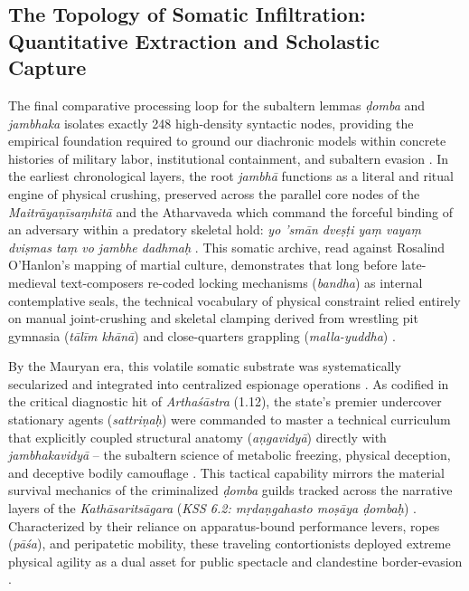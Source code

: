 \documentclass[11pt,twoside,letterpaper]{article}
\begin{document}
\subsection{The Topology of Somatic Infiltration: Quantitative Extraction and Scholastic Capture}
The final comparative processing loop for the subaltern lemmas \textit{ḍomba} and \textit{jambhaka} isolates exactly 248 high-density syntactic nodes, providing the empirical foundation required to ground our diachronic models within concrete histories of military labor, institutional containment, and subaltern evasion \citep{Lorenzen1978, mccartneyforthcomingA}. In the earliest chronological layers, the root \textit{jambhā} functions as a literal and ritual engine of physical crushing, preserved across the parallel core nodes of the \textit{Maitrāyaṇīsaṃhitā} and the Atharvaveda which command the forceful binding of an adversary within a predatory skeletal hold: \textit{yo ’smān dveṣṭi yaṃ vayaṃ dviṣmas taṃ vo jambhe dadhmaḥ} \citep{mccartneyforthcomingB}. This somatic archive, read against Rosalind O’Hanlon’s mapping of martial culture, demonstrates that long before late-medieval text-composers re-coded locking mechanisms (\textit{bandha}) as internal contemplative seals, the technical vocabulary of physical constraint relied entirely on manual joint-crushing and skeletal clamping derived from wrestling pit gymnasia (\textit{tālīm khānā}) and close-quarters grappling (\textit{malla-yuddha}) \citep{Birch2024, OHanlon2007}.

By the Mauryan era, this volatile somatic substrate was systematically secularized and integrated into centralized espionage operations \citep{mccartney2026}. As codified in the critical diagnostic hit of \textit{Arthaśāstra} (1.12), the state’s premier undercover stationary agents (\textit{sattriṇaḥ}) were commanded to master a technical curriculum that explicitly coupled structural anatomy (\textit{aṇgavidyā}) directly with \textit{jambhakavidyā} – the subaltern science of metabolic freezing, physical deception, and deceptive bodily camouflage \citep{mccartney2026}. This tactical capability mirrors the material survival mechanics of the criminalized \textit{ḍomba} guilds tracked across the narrative layers of the \textit{Kathāsaritsāgara} (\textit{KSS 6.2: mṛdaṇgahasto moṣāya ḍombaḥ}) \citep{mccartneyforthcomingB}. Characterized by their reliance on apparatus-bound performance levers, ropes (\textit{pāśa}), and peripatetic mobility, these traveling contortionists deployed extreme physical agility as a dual asset for public spectacle and clandestine border-evasion \citep{mccartney2026, mccartneyforthcomingB}.
\end{document}

